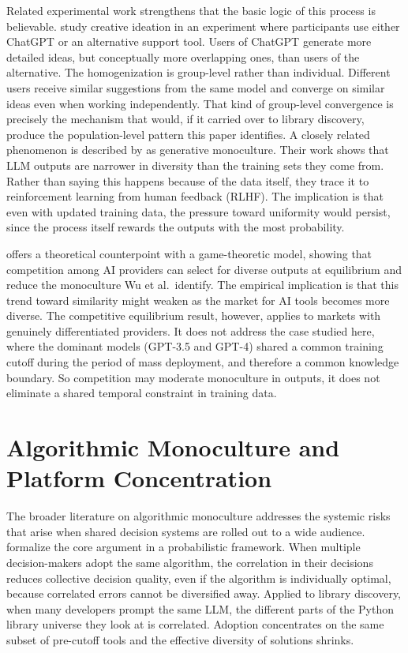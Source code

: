 \documentclass[12pt, a4paper]{report}
\begin{document}
Related experimental work strengthens that the basic logic of this process is believable. \citet{anderson2024homogenization} study creative ideation in an experiment where participants use either ChatGPT or an alternative support tool. Users of ChatGPT generate more detailed ideas, but conceptually more overlapping ones, than users of the alternative. The homogenization is group-level rather than individual. Different users receive similar suggestions from the same model and converge on similar ideas even when working independently. That kind of group-level convergence is precisely the mechanism that would, if it carried over to library discovery, produce the population-level pattern this paper identifies. A closely related phenomenon is described by \citet{wu2025generative} as generative monoculture. Their work shows that LLM outputs are narrower in diversity than the training sets they come from. Rather than saying this happens because of the data itself, they trace it to reinforcement learning from human feedback (RLHF). The implication is that even with updated training data, the pressure toward uniformity would persist, since the process itself rewards the outputs with the most probability.

\citet{raghavan2024competition} offers a theoretical counterpoint with a game-theoretic model, showing that competition among AI providers can select for diverse outputs at equilibrium and reduce the monoculture Wu et al.\ identify. The empirical implication is that this trend toward similarity might weaken as the market for AI tools becomes more diverse. The competitive equilibrium result, however, applies to markets with genuinely differentiated providers. It does not address the case studied here, where the dominant models (GPT-3.5 and GPT-4) shared a common training cutoff during the period of mass deployment, and therefore a common knowledge boundary. So competition may moderate monoculture in outputs, it does not eliminate a shared temporal constraint in training data.

\section{Algorithmic Monoculture and Platform Concentration}\label{sec:lit-monoculture}

The broader literature on algorithmic monoculture addresses the systemic risks that arise when shared decision systems are rolled out to a wide audience. \citet{kleinberg2021algorithmic} formalize the core argument in a probabilistic framework. When multiple decision-makers adopt the same algorithm, the correlation in their decisions reduces collective decision quality, even if the algorithm is individually optimal, because correlated errors cannot be diversified away. Applied to library discovery, when many developers prompt the same LLM, the different parts of the Python library universe they look at is correlated. Adoption concentrates on the same subset of pre-cutoff tools and the effective diversity of solutions shrinks.
\end{document}
